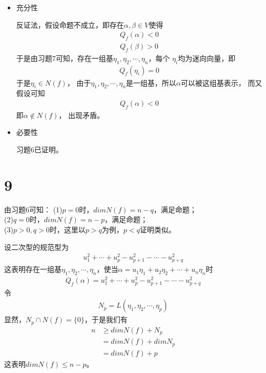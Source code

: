 \documentclass{article}
\begin{document}
\begin{itemize}
  \item 充分性

        反证法，假设命题不成立，即存在$\alpha, \beta \in V$使得
        \begin{align*}
          Q_f(\alpha) < 0 \\
          Q_f(\beta) > 0
        \end{align*}
        于是由习题7可知，存在一组基$\eta_1, \eta_2, \cdots, \eta_n$，每个
        $\eta_i$均为迷向向量，即
        \begin{align*}
          Q_f(\eta_i) = 0
        \end{align*}
        于是$\eta_i \in N(f)$，
        由于$\eta_1, \eta_2, \cdots, \eta_n$是一组基，所以$\alpha$可以被这组基表示，
        而又假设可知
        \begin{align*}
          Q_f(\alpha) < 0
        \end{align*}
        即$\alpha \not \in N(f)$，
        出现矛盾。

  \item 必要性

        习题6已证明。
\end{itemize}

\section*{9}

由习题6可知：
(1)$p = 0$时，$dim N(f) = n - q$，满足命题；\\
(2)$q = 0$时，$dim N(f) = n - p$，满足命题；\\
(3)$p > 0, q > 0$时，这里以$p > q$为例，$p < q$证明类似。

设二次型的规范型为
\begin{align*}
  u_1^2 + \cdots + u_p^2 - u_{p+1}^2 - \cdots - u_{p + q}^2
\end{align*}
这表明存在一组基$\eta_1, \eta_2, \cdots, \eta_n$，使当$\alpha = u_1 \eta_1 + u_2 \eta_2 + \cdots + u_n \eta_n$时
\begin{align*}
  Q_f(\alpha) = u_1^2 + \cdots + u_p^2 - u_{p+1}^2 - \cdots - u_{p + q}^2
\end{align*}
令
\begin{align*}
  N_p = L(\eta_1, \eta_2, \cdots, \eta_p)
\end{align*}
显然，$N_p \cap N(f) = \{0\}$，于是我们有
\begin{align*}
  n & \geq dim N(f) + N_p  \\
    & = dim N(f) + dim N_p \\
    & = dim N(f) + p
\end{align*}
这表明$dim N(f) \leq n - p$。
\end{document}
